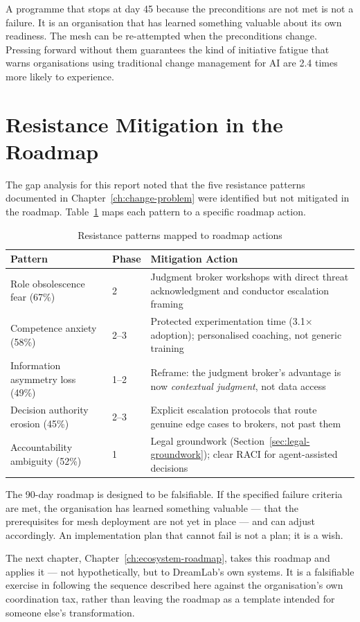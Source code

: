 \begin{keyinsight}
A programme that stops at day 45 because the preconditions are not met is not a failure. It is an organisation that has learned something valuable about its own readiness. The mesh can be re-attempted when the preconditions change. Pressing forward without them guarantees the kind of initiative fatigue that \textcite{Gartner2025} warns organisations using traditional change management for AI are 2.4 times more likely to experience.
\end{keyinsight}

\section{Resistance Mitigation in the Roadmap}

The gap analysis for this report noted that the five resistance patterns documented in Chapter~\ref{ch:change-problem} were identified but not mitigated in the roadmap. Table~\ref{tab:resistance-mitigation} maps each pattern to a specific roadmap action.

\begin{table}[H]
\centering
\caption{Resistance patterns mapped to roadmap actions}
\label{tab:resistance-mitigation}
\begin{tabularx}{\textwidth}{l l X}
\toprule
\textbf{Pattern} & \textbf{Phase} & \textbf{Mitigation Action} \\
\midrule
Role obsolescence fear (67\%) & 2 & Judgment broker workshops with direct threat acknowledgment and conductor escalation framing \\
\addlinespace
Competence anxiety (58\%) & 2--3 & Protected experimentation time (3.1$\times$ adoption); personalised coaching, not generic training \\
\addlinespace
Information asymmetry loss (49\%) & 1--2 & Reframe: the judgment broker's advantage is now \emph{contextual judgment}, not data access \\
\addlinespace
Decision authority erosion (45\%) & 2--3 & Explicit escalation protocols that route genuine edge cases to brokers, not past them \\
\addlinespace
Accountability ambiguity (52\%) & 1 & Legal groundwork (Section~\ref{sec:legal-groundwork}); clear RACI for agent-assisted decisions \\
\bottomrule
\end{tabularx}
\end{table}

The 90-day roadmap is designed to be falsifiable. If the specified failure criteria are met, the organisation has learned something valuable --- that the prerequisites for mesh deployment are not yet in place --- and can adjust accordingly. An implementation plan that cannot fail is not a plan; it is a wish.

The next chapter, Chapter~\ref{ch:ecosystem-roadmap}, takes this roadmap and applies it --- not hypothetically, but to DreamLab's own systems. It is a falsifiable exercise in following the sequence described here against the organisation's own coordination tax, rather than leaving the roadmap as a template intended for someone else's transformation.
